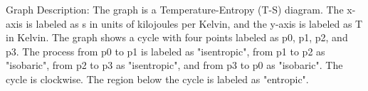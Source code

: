 Graph Description:
The graph is a Temperature-Entropy (T-S) diagram. The x-axis is labeled as s in units of kilojoules per Kelvin, and the y-axis is labeled as T in Kelvin. The graph shows a cycle with four points labeled as p0, p1, p2, and p3. The process from p0 to p1 is labeled as "isentropic", from p1 to p2 as "isobaric", from p2 to p3 as "isentropic", and from p3 to p0 as "isobaric". The cycle is clockwise. The region below the cycle is labeled as "entropic".
